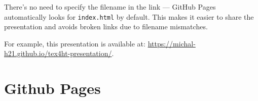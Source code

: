 There's no need to specify the filename in the link — GitHub Pages
automatically looks for \texttt{index.html} by default. This makes it easier to share
the presentation and avoids broken links due to filename mismatches.

For example, this presentation is available at: \url{https://michal-h21.github.io/tex4ht-presentation/}.

\section{Github Pages}



